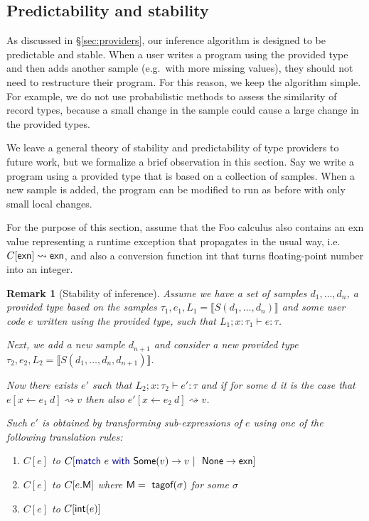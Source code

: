 \documentclass[10pt,nocopyrightspace]{sigplanconf}
\newcommand{\kvd}[1]{\textnormal{\textcolor{kvdclr}{\sffamily #1}}}
\newcommand{\ident}[1]{\textnormal{\sffamily #1}}
\newcommand{\tytagof}{\ident{tagof}}
\newcommand{\reduce}{\rightsquigarrow}
\newcommand{\sem}[1]{\llbracket #1 \rrbracket}
\newcommand{\semalt}[1]{S(#1)}
\newtheorem{remark}{Remark}
\begin{document}

\subsection{Predictability and stability}
\label{sec:impl-stable}

As discussed in \S\ref{sec:providers}, our inference algorithm is designed to be predictable
and stable. When a user writes a program using the provided type and then adds another sample
(e.g.~with more missing values), they should not need to restructure their program.
For this reason, we keep the algorithm simple. For example, we do not use probabilistic methods to
assess the similarity of record types, because a small change in the sample could cause a large change
in the provided types.

We leave a general theory of stability and predictability of type providers to future work, but
we formalize a brief observation in this section. Say we write a program using a provided type
that is based on a collection of samples. When a new sample is added, the program can be modified
to run as before with only small local changes.

For the purpose of this section, assume that the Foo calculus also contains an \ident{exn}
value representing a runtime exception that propagates in the usual way,
i.e.~$C[\ident{exn}]\reduce\ident{exn}$, and also a conversion function \ident{int} that
turns floating-point number into an integer.

\begin{remark}[Stability of inference]
Assume we have a set of samples $d_1, \ldots, d_n$, a provided type based on the samples
$\tau_1, e_1, L_1 = \sem{\semalt{d_1, \ldots, d_n}}$ and some user code $e$ written using
the provided type, such that $L_1; x:\tau_1\vdash e : \tau$.

Next, we add a new sample $d_{n+1}$ and consider a new provided type
$\tau_2, e_2, L_2 = \sem{\semalt{d_1, \ldots, d_n, d_{n+1}}}$.

Now there exists $e'$ such that $L_2; x:\tau_2\vdash e' : \tau$ and if
for some $d$ it is the case that $e[x\leftarrow e_1~d] \reduce v$ then
also $e'[x\leftarrow e_2~d] \reduce v$.

Such $e'$ is obtained by transforming sub-expressions of $e$ using one of the following
translation rules:
%
\begin{enumerate}
\item
$C[e]$ to $C[\kvd{match}~e~\kvd{with}~\ident{Some}(v) \rightarrow v~|~\ident{None} \rightarrow \ident{exn}]$
\item
$C[e]$ to $C[e.\ident{M}]$ where $\ident{M} = \tytagof(\sigma)$ for some $\sigma$
\item
$C[e]$ to $C[\ident{int}(e)]$
\end{enumerate}
\end{remark}
\end{document}
